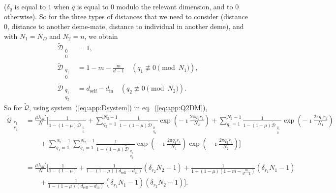\documentclass[11pt, letterpaper]{article}
\renewcommand{\eqref}[1]{\textup{{\normalfont eq.~(\ref{#1}}\normalfont)}}
\newcommand{\sysref}[1]{system~(\ref{#1})}
\newcommand{\din}{d_{\textrm{in}}}
\newcommand{\dself}{d_{\textrm{self}}}
\newcommand{\ndemes}{N_D}
\begin{document}
%
($\delta_q$ is equal to $1$ when $q$ is equal to $0$ modulo the relevant dimension, and to $0$ otherwise). So for the three types of distances that we need to consider (distance $0$, distance to another deme-mate, distance to individual in another deme), and with $N_1 = \ndemes$ and $N_2 = n$, we obtain
%
\begin{subequations}\label{eq:app:Dsystem}
\begin{align}
\tilde{\mathcal{D}}_{\substack{0\\0}} & = 1,\\
%
\tilde{\mathcal{D}}_{\substack{q_1\\0}} & = 1-m -  \frac{m}{d-1} \quad (q_1 \not \equiv 0 \pmod{N_1}),\\
%
\tilde{\mathcal{D}}_{\substack{q_1\\q_2}} & = \dself - \din \quad (q_2 \not \equiv 0 \pmod{N_2}).
\end{align}
\end{subequations}
%
So for $\tilde{\mathcal{Q}}$, using \sysref{eq:app:Dsystem} in \eqref{eq:app:Q2DM}, 
%
\begin{align}
\tilde{\mathcal{Q}}_{\substack{r_1\\r_2}}&= \frac{\mu \lambda_M'}{N} \Bigg[  \frac{1}{1 - (1-\mu) \tilde{\mathcal{D}}_{\substack{0\\ 0}}} + \sum_{q_2 = 1}^{N_2-1}\frac{1}{1 - (1-\mu) \tilde{\mathcal{D}}_{\substack{0\\ q_2}}} \exp\left(-\imath \frac{2\pi q_2 r_2}{N_2}\right) %
+ \sum_{q_1 =1}^{N_1 - 1} \frac{1}{1 - (1-\mu) \tilde{\mathcal{D}}_{\substack{q_1\\ 0}}} \exp\left(-\imath \frac{2\pi q_1 r_1}{N_1}\right) \nonumber \\
& \qquad 
+ 
 \sum_{q_1=1}^{N_1 -1} \sum_{q_2=1}^{N_2 -1} \frac{1}{1 - (1-\mu) \tilde{\mathcal{D}}_{\substack{q_1\\ q_2}}} \exp\left(-\imath \frac{2\pi q_1 r_1}{N_1}\right)\exp\left(-\imath \frac{2\pi q_2 r_2}{N_2}\right) \Bigg]\nonumber \\
& = \frac{\mu \lambda_M'}{N} \Bigg[  \frac{1}{1 - (1-\mu) } 
+ \frac{1}{1 - (1-\mu) (\dself - \din)} (\delta_{r_2} N_2 - 1) %
+  \frac{1}{1 - (1-\mu) (1-m-\frac{m}{d-1})} (\delta_{r_1} N_1 - 1) \nonumber \\
& \qquad 
+ 
\frac{1}{1 - (1-\mu) (\dself - \din) } (\delta_{r_1} N_1 - 1) (\delta_{r_2} N_2 - 1) \Bigg].\label{eq:app:Q2DMsol}
% 
\end{align}
\end{document}
